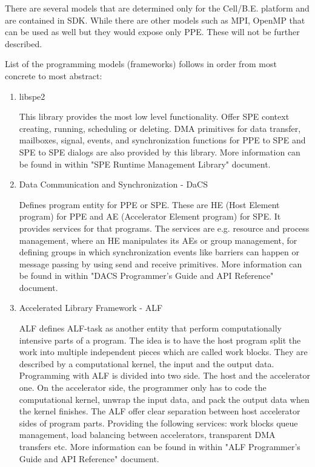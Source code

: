 \par
There are several models that are determined only for the Cell/B.E. platform and are contained in SDK.
While there are other models such as MPI, OpenMP that can be used as well but they would expose only PPE.
These will not be further described.

List of the programming models (frameworks) follows in order from most concrete to most abstract:
\begin{enumerate}
\item {libspe2}
\par
This library provides the most low level functionality.
Offer SPE context creating, running, scheduling or deleting.
DMA primitives for data transfer, mailboxes, signal, events, and synchronization functions for PPE to SPE and SPE to SPE dialogs are also provided by this library.
More information can be found in \cite{performanceToolRef} within "SPE Runtime Management Library" document.

\item {Data Communication and Synchronization - DaCS}
\par
Defines program entity for PPE or SPE.
These are HE (Host Element program) for PPE and AE (Accelerator Element program) for SPE.
It provides services for that programs.
The services are e.g. resource and process management, where an HE manipulates its AEs or group management, for defining groups in which synchronization events like barriers can happen or message passing by using send and receive primitives.
More information can be found in \cite{performanceToolRef} within "DACS Programmer's Guide and API Reference" document.

\item {Accelerated Library Framework - ALF}
\par
ALF defines ALF-task as another entity that perform computationally intensive parts of a program.
The idea is to have the host program split the work into multiple independent pieces which are called work blocks.
They are described by a computational kernel, the input and the output data.
Programming with ALF is divided into two side.
The host and the accelerator one.
On the accelerator side, the programmer only has to code the computational kernel, unwrap the input data, and pack the output data when the kernel finishes.
The ALF offer clear separation between host accelerator sides of program parts.
Providing the following services: work blocks queue management, load balancing between accelerators, transparent DMA transfers etc.
More information can be found in \cite{performanceToolRef} within "ALF Programmer's Guide and API Reference" document.

\end{enumerate}


